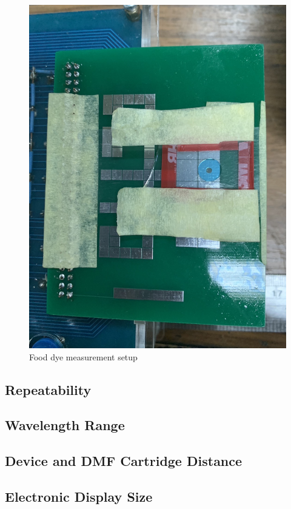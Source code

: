 \documentclass[conference]{IEEEtran}
\begin{document}
\begin{figure}[htbp]
    \centerline{\includegraphics[angle=90,scale=0.12]{dye-cartridge.jpg}}
    \caption{Food dye measurement setup}
    \label{dye_setup}
    \end{figure}

\subsection{Repeatability}
\subsection{Wavelength Range}
\subsection{Device and DMF Cartridge Distance}
\subsection{Electronic Display Size}
\end{document}
